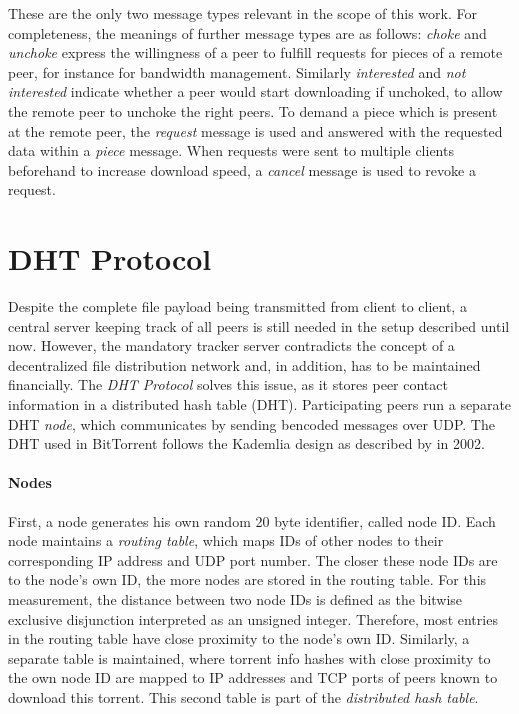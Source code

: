 \documentclass[10pt, a4paper, twoside=false, headsepline]{scrbook}
\renewcommand{\_}{\origunderscore\allowbreak}
\begin{document}
These are the only two message types relevant in the scope of this work. For completeness, the meanings of further message types are as follows: \emph{choke} and \emph{unchoke} express the willingness of a peer to fulfill requests for pieces of a remote peer, for instance for bandwidth management. Similarly \emph{interested} and \emph{not interested} indicate whether a peer would start downloading if unchoked, to allow the remote peer to unchoke the right peers. To demand a piece which is present at the remote peer, the \emph{request} message is used and answered with the requested data within a \emph{piece} message. When requests were sent to multiple clients beforehand to increase download speed, a \emph{cancel} message is used to revoke a request.

\section{DHT Protocol}
\label{dht}
Despite the complete file payload being transmitted from client to client, a central server keeping track of all peers is still needed in the setup described until now. However, the mandatory tracker server contradicts the concept of a decentralized file distribution network and, in addition, has to be maintained financially. The \emph{DHT Protocol} \cite{bep5} solves this issue, as it stores peer contact information in a distributed hash table (DHT). Participating peers run a separate DHT \emph{node}, which communicates by sending bencoded messages over UDP. The DHT used in BitTorrent follows the Kademlia design as described by \textcite{kademlia} in 2002.

\paragraph{Nodes}
First, a node generates his own random 20 byte identifier, called node ID. Each node maintains a \emph{routing table}, which maps IDs of other nodes to their corresponding IP address and UDP port number. The closer these node IDs are to the node's own ID, the more nodes are stored in the routing table. For this measurement, the distance between two node IDs is defined as the bitwise exclusive disjunction interpreted as an unsigned integer. Therefore, most entries in the routing table have close proximity to the node's own ID. Similarly, a separate table is maintained, where torrent info hashes with close proximity to the own node ID are mapped to IP addresses and TCP ports of peers known to download this torrent. This second table is part of the \emph{distributed hash table}.
\end{document}
